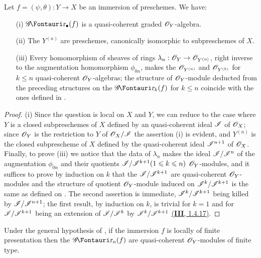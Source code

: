 \begin{proposition}[16.1.5]
\label{IV.16.1.6}
Let $f = (\psi, \theta): Y \to X$ be an immersion of preschemes. We have:
\begin{enumerate}
  \item[(i)] $\shGr_\bullet(f)$ is a quasi-coherent graded $\mathscr{O}_Y$-algebra.
  \item[(ii)] The $Y^{(n)}$ are preschemes, canonically isomorphic to subpreschemes of $X$.
  \item[(iii)] Every homomorphism of sheaves of rings $\lambda_n: \sh{O}_Y \to \sh{O}_{Y^{(n)}}$, right inverse to the augmentation homomorphism $\phi_{0n}$, makes the $\mathscr{O}_{Y^{(n)}}$ and $\mathscr{O}_{Y^{(k)}}$ for $k\leq n$ quasi-coherent $\mathscr{O}_Y$-algebras;
  the structure of $\mathscr{O}_Y$-module deducted from the preceding structures on the $\shGr_k(f)$ for $k \leq n$ coincide with the ones defined in .
\end{enumerate}
\end{proposition}

\begin{proof}
(i) Since the question is local on $X$ and $Y$, we can reduce to the case where $Y$ is a closed subpreschemes of $X$ defined by an quasi-coherent ideal $\mathscr{I}$ of $\mathscr{O}_X$;
since $\mathscr{O}_Y$ is the restriction to $Y$ of $\mathscr{O}_X/\mathscr{I}$ the assertion (i) is evident, and $Y^{(n)}$ is the closed subprescheme of $X$ defined by the quasi-coherent ideal $\mathscr{I}^{n+1}$ of $\mathscr{O}_X$.
Finally, to prove (iii) we notice that the data of $\lambda_n$ makes the ideal $\mathscr{I}/\mathscr{I}^n$ of the augmentation $\phi_{0n}$ and their quotients $\mathscr{I}/\mathscr{I}^{k+1} (1\leqslant k \leqslant n)$ $\mathscr{O}_Y$-modules, and it suffices to prove by induction on $k$ that the $\mathscr{I}/\mathscr{I}^{k+1}$ are quasi-coherent $\mathscr{O}_Y$-modules and the structure of quotient $\mathscr{O}_Y$-module induced on $\mathscr{I}^k/\mathscr{I}^{k+1}$ is the same as defined on .
The second assertion is immediate, $\mathscr{I}^k/\mathscr{I}^{k+1}$ being killed by $\mathscr{I}/\mathscr{I}^{n+1}$;
the first result, by induction on $k$, is trivial for $k=1$ and for $\mathscr{I}/\mathscr{I}^{k+1}$ being an extension of $\mathscr{I}/\mathscr{I}^{k}$ by $\mathscr{I}^k/\mathscr{I}^{k+1}$ \hyperref[section:III.1.4.17]{(\textbf{III}, 1.4.17)}.
\end{proof}

\begin{corollary}[16.1.6]
\label{IV.16.1.6}
Under the general hypothesis of , if the immersion $f$ is locally of finite presentation then the $\shGr_n(f)$ are quasi-coherent $\mathscr{O}_Y$-modules of finite type.
\end{corollary}

